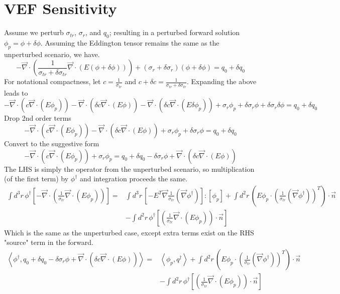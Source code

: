 \documentclass{article}
\newcommand{\bra}{\left\langle}
\newcommand{\ket}{\right\rangle}
\newcommand{\vdiv}{\vec{\nabla} \cdot}
\newcommand{\vgrad}{\vec{\nabla}}
\begin{document}
\section{VEF Sensitivity}
Assume we perturb $\sigma_{tr}$, $\sigma_r$, and $q_0$; resulting in a perturbed forward solution $\phi_p = \phi + \delta \phi$. Assuming the Eddington tensor remains the same as the unperturbed scenario, we have.
\[
-\vdiv \left( \frac{1}{\sigma_{tr}+\delta \sigma_{tr}} \vdiv \left( E \left( \phi + \delta \phi \right) \right) \right)
+ \left( \sigma_r + \delta \sigma_r \right) \left( \phi + \delta \phi \right)
= q_0 + \delta q_0
\]
For notational compactness, let $c=\frac{1}{\sigma_{tr}}$ and $c + \delta c = \frac{1}{\sigma_{tr}+\delta \sigma_{tr}}$. Expanding the above leads to 
\[ 
-\vdiv \left( c \vdiv \left( E \phi_p \right) \right) 
- \vdiv \left( \delta c \vdiv \left( E \phi \right) \right) 
- \vdiv \left( \delta c \vdiv \left( E \delta \phi_p \right) \right) 
+ \sigma_r \phi_p
+ \delta \sigma_r \phi
+ \delta \sigma_r \delta \phi
= q_0 + \delta q_0 
\]
Drop 2nd order terms
\[ 
-\vdiv \left( c \vdiv \left( E \phi_p \right) \right) 
- \vdiv \left( \delta c \vdiv \left( E \phi \right) \right) 
+ \sigma_r \phi_p
+ \delta \sigma_r \phi
= q_0 + \delta q_0 
\]
Convert to the suggestive form
\[ 
-\vdiv \left( c \vdiv \left( E \phi_p \right) \right) + \sigma_r \phi_p
= q_0 + \delta q_0 - \delta \sigma_r \phi + \vdiv \left( \delta c \vdiv \left( E \phi \right) \right) 
\]
The LHS is simply the operator from the unperturbed scenario, so multiplication (of the first term) by $\phi^\dag$ and integration proceeds the same.
\begin{align*}
\int d^3r \, \phi^\dag \left[  -\vdiv \left( \frac{1}{\sigma_{tr}} \vdiv \left( E \phi_p \right) \right) \right] 
=& \int d^3r \, \left[- E^T \vgrad \frac{1}{ \sigma_{tr}} \left(  \vgrad \phi^\dag \right) \right] : \left[ \phi_p \right] 
+ \int d^2 r \, \left( E \phi_p \cdot \left( \frac{1}{ \sigma_{tr}} \left(  \vgrad \phi^\dag \right) \right)^T \right) \cdot \vec{n} \\
&- \int d^2 r \, \phi^\dag \left[ \left( \frac{1}{\sigma_{tr}} \vdiv \left( E \phi_p \right) \right) \cdot \vec{n} \right]
\end{align*}
Which is the same as the unperturbed case, except extra terms exist on the RHS "source" term in the forward.
\begin{align*}
\bra \phi^\dag , q_0 + \delta q_0 - \delta \sigma_r \phi + \vdiv \left( \delta c \vdiv \left( E \phi \right) \right) \ket =& \bra \phi_p, q^\dag \ket + \int d^2 r \, \left( E \phi_p \cdot \left( \frac{1}{ \sigma_{tr}} \left(  \vgrad \phi^\dag \right) \right)^T \right) \cdot \vec{n} \\
&- \int d^2 r \, \phi^\dag \left[ \left( \frac{1}{\sigma_{tr}} \vdiv \left( E \phi_p \right) \right) \cdot \vec{n} \right]
\end{align*}
\end{document}
